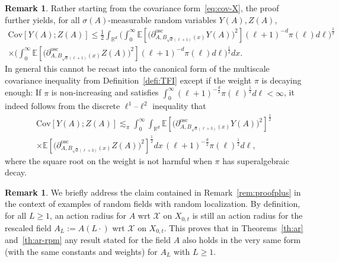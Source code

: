 \documentclass[11pt]{article}
\theoremstyle{definition}
\newtheorem{rema}[theo]{Remark}
\numberwithin{equation}{section}
\numberwithin{figure}{section}
\numberwithin{table}{section}
\newcommand{\R}{\mathbb R}
\newcommand{\expec}[1]{\mathbb{E}\left[#1 \right]}
\newcommand{\X}{\mathcal X}
\newcommand{\osc}{\partial^{\mathrm{osc}}}
\newcommand{\oscd}[1]{\mathrel{\osc_{#1}}}
\newcommand{\cov}[2]{\mathrm{Cov}\left[#1;#2\right]}
\begin{document}
\begin{rema}\label{rem:cov-alm}
Rather starting from the covariance form~\eqref{eq:cov-X}, the proof further yields, for all $\sigma(A)$-measurable random variables $Y(A),Z(A)$,
\begin{multline*}
\cov{Y(A)}{Z(A)}\le \frac12\int_{\R^d}\bigg(\int_0^\infty\expec{\Big(\oscd{A,B_{\sqrt d(\ell+1)}(x)}Y(A)\Big)^2}(\ell+1)^{-d}\pi(\ell) d\ell\bigg)^\frac12\\
\times\bigg(\int_0^\infty\expec{\Big(\oscd{A,B_{\sqrt d(\ell+1)}(x)}Z(A)\Big)^2}(\ell+1)^{-d}\pi(\ell) d\ell\bigg)^\frac12dx.
\end{multline*}
In general this cannot be recast into the canonical form of the multiscale covariance inequality from Definition~\ref{defi:TFI} except if the weight $\pi$ is decaying enough: If $\pi$ is non-increasing and satisfies $\int_0^\infty(\ell+1)^{-\frac d2}\pi(\ell)^\frac12d\ell<\infty$, it indeed follows from the discrete $\ell^1$--$\ell^2$ inequality that
\begin{multline*}
\cov{Y(A)}{Z(A)}\lesssim_\pi \int_0^\infty\int_{\R^d}\expec{\Big(\oscd{A,B_{\sqrt d(\ell+3)}(x)}Y(A)\Big)^2}^\frac12\\
\times \expec{\Big(\oscd{A,B_{\sqrt d(\ell+3)}(x)}Z(A)\Big)^2}^\frac12dx\,(\ell+1)^{-\frac d2}\pi(\ell)^\frac12 d\ell,
\end{multline*}
where the square root on the weight is not harmful when $\pi$ has superalgebraic decay.
\end{rema}

\begin{rema}\label{rem:rescale-1}
We briefly address the claim contained in Remark~\ref{rem:proofplus} in the context of examples of random fields with random localization. By definition, for all $L\ge1$, an action radius for $A$ wrt $\X$ on $X_{0,t}$ is still an action radius for the rescaled field $A_L:=A(L\cdot)$ wrt $\X$ on $X_{0,t}$. This proves that in Theorems~\ref{th:ar} and~\ref{th:ar-rpm} any result stated for the field $A$ also holds in the very same form (with the same constants and weights) for $A_L$ with $L\ge1$.
\end{rema}
\end{document}
